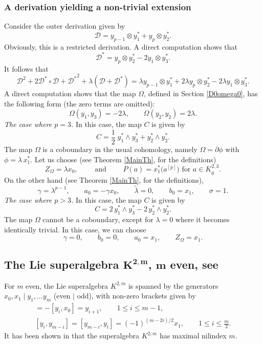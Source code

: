 \documentclass[10pt,a4paper]{amsart}
\numberwithin{equation}{section}
\begin{document}
\subsubsection{A derivation yielding a non-trivial extension} Consider the outer derivation given by
\[
{\mathscr D}=y_{p-1}\otimes y_1^*+y_p \otimes y_2^*.
\]
Obviously, this is a restricted derivation. A direct computation shows that
\[
{\mathscr D}^*= y_p \otimes y_2^* -2 y_1 \otimes y_3^*.
\]
It follows that
\[
{\mathscr D}^2+2 {\mathscr D}^*\circ {\mathscr D}+{{\mathscr D}^*}^2+\lambda({\mathscr D}+{\mathscr D}^*)=
\lambda y_{p-1}\otimes y_1^*+2\lambda y_p \otimes y^*_2-2\lambda y_1\otimes y^*_3.
\]
A direct computation shows that the map $\Omega$, defined in Section \ref{D0omega0}, has the following form (the zero terms are omitted):
\[
\Omega(y_1,y_3)=-2\lambda, \qquad \Omega(y_2,y_2)=2\lambda .
\]
\textit{The case where $p=3$.} In this case, the map $C$ is given by
\[
C=\frac{1}{2} \; y_1^*\wedge y_3^* +y_2^*\wedge y_2^*.
\]
The map $\Omega$ is a coboundary in the usual cohomology, namely $\Omega= \partial \phi$ with $\phi=\lambda \, x_1^*$. Let us choose (see Theorem \ref{MainTh}, for the definitions)
\[
Z_\Omega=\lambda x_0,\qquad \text{ and } \qquad P(a)=x^*_1\bigl(a^{[p]}\bigr) \text{ for $a \in K^{2,3}_{\bar 0}$}.
\]
On the other hand (see Theorem \ref{MainTh}, for the definitions),
\[
\gamma=\lambda^{p-1},\qquad a_0=- \gamma x_0, \qquad \tilde \lambda=0, \qquad b_0=x_1,\qquad \sigma=1.
\]
\textit{The case where $p>3$.} In this case, the map $C$ is given by
\[
C=2 \, y_1^*\wedge y_{3}^* - 2 \,y_2^*\wedge y_2^*.
\]
The map $\Omega$ cannot be a coboundary, except for $\lambda=0$ where it becomes identically trivial. In this case, we can choose
\[
\gamma=0, \qquad b_0=0, \qquad a_0= x_1,\qquad Z_\Omega= x_1.
\]

\subsection[The Lie superalgebra K\^{}\{2,m\}, m even, see \protect{[28]}]{The Lie superalgebra $\boldsymbol{K^{2,m}}$, $\boldsymbol{m}$ even, see \cite{GKN}}

For $m$ even, the Lie superalgebra $K^{2,m}$ is spanned by the generators $x_0, x_1\mid y_1,\ldots y_m$ (even $|$ odd), with non-zero brackets given by
\begin{gather*}
[x_0, y_i] = -[y_i, x_0] = y_{i+1},\qquad 1\leq i\leq m-1, \\
[y_i, y_{m-i}] = [ y_{m-i}, y_i] = (-1)^{(m-2i)/2}x_1, \qquad 1 \leq i\leq \frac{m}{2}.
\end{gather*}
It has been shown in \cite{GKN} that the superalgebra $K^{2,m}$ has maximal nilindex $m$.
\end{document}
